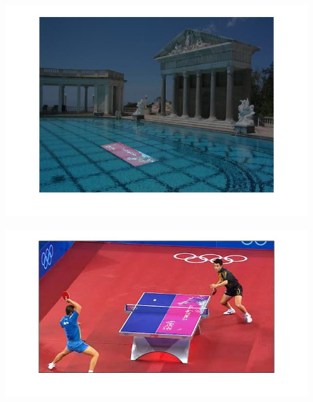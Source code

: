 \documentclass[12pt]{article}
\begin{document}
\begin{figure}[htp]
\centering
\includegraphics[width=1\textwidth]{overlayPool.jpg}\hfill
\end{figure}

\begin{figure}[htp]
\centering
\includegraphics[width=1\textwidth]{overlayTable.jpg}\hfill
\end{figure}

\clearpage
\end{document}
